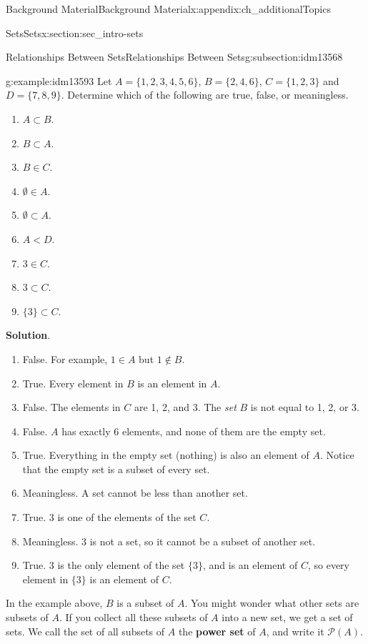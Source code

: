 \documentclass[oneside,10pt,]{book}
\newcommand{\terminology}[1]{\textbf{#1}}
\numberwithin{equation}{chapter}
\def\pow{\mathcal P}
\newcommand{\lt}{<}
\begin{document}
\begin{appendixptx}{Background Material}{}{Background Material}{}{}{x:appendix:ch_additionalTopics}
\begin{sectionptx}{Sets}{}{Sets}{}{}{x:section:sec_intro-sets}
\begin{subsectionptx}{Relationships Between Sets}{}{Relationships Between Sets}{}{}{g:subsection:idm13568}
\begin{example}{}{g:example:idm13593}%
Let \(A = \{1, 2, 3, 4, 5, 6\}\), \(B = \{2, 4, 6\}\), \(C = \{1, 2, 3\}\) and \(D = \{7, 8, 9\}\). Determine which of the following are true, false, or meaningless.%
\par
%
\begin{enumerate}
\item{}\(A \subset B\).%
\item{}\(B \subset A\).%
\item{}\(B \in C\).%
\item{}\(\emptyset \in A\).%
\item{}\(\emptyset \subset A\).%
\item{}\(A \lt  D\).%
\item{}\(3 \in C\).%
\item{}\(3 \subset C\).%
\item{}\(\{3\} \subset C\).%
\end{enumerate}
%
\par\smallskip%
\noindent\textbf{Solution}.\hypertarget{g:solution:idm13620}{}\quad{}%
\begin{enumerate}
\item{}False. For example, \(1\in A\) but \(1 \notin B\).%
\item{}True. Every element in \(B\) is an element in \(A\).%
\item{}False. The elements in \(C\) are 1, 2, and 3. The \emph{set} \(B\) is not equal to 1, 2, or 3.%
\item{}False. \(A\) has exactly 6 elements, and none of them are the empty set.%
\item{}True. Everything in the empty set (nothing) is also an element of \(A\). Notice that the empty set is a subset of every set.%
\item{}Meaningless. A set cannot be less than another set.%
\item{}True. \(3\) is one of the elements of the set \(C\).%
\item{}Meaningless. \(3\) is not a set, so it cannot be a subset of another set.%
\item{}True. \(3\) is the only element of the set \(\{3\}\), and is an element of \(C\), so every element in \(\{3\}\) is an element of \(C\).%
\end{enumerate}
%
\end{example}
In the example above, \(B\) is a subset of \(A\). You might wonder what other sets are subsets of \(A\). If you collect all these subsets of \(A\) into a new set, we get a set of sets. We call the set of all subsets of \(A\) the \terminology{power set}  of \(A\), and write it \(\pow(A)\).%

\end{subsectionptx}
\end{sectionptx}
\end{appendixptx}
\end{document}
